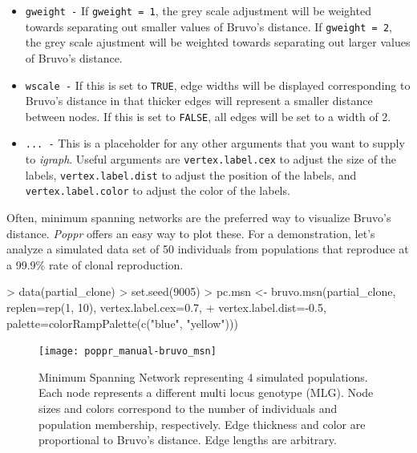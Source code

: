 \documentclass[letterpaper]{article}
\begin{document}
\begin{itemize}
  \item \texttt{gweight -} If \texttt{gweight = 1}, the grey scale adjustment will be weighted towards separating out smaller values of Bruvo's distance. If \texttt{gweight = 2}, the grey scale ajustment will be weighted towards separating out larger values of Bruvo's distance.
  \item \texttt{wscale -} If this is set to \texttt{TRUE}, edge widths will be displayed corresponding to Bruvo's distance in that thicker edges will represent a smaller distance between nodes. If this is set to \texttt{FALSE}, all edges will be set to a width of 2. 
  \item \texttt{... -} This is a placeholder for any other arguments that you want to supply to \textit{igraph}. Useful arguments are \texttt{vertex.label.cex} to adjust the size of the labels, \texttt{vertex.label.dist} to adjust the position of the labels, and \texttt{vertex.label.color} to adjust the color of the labels.
\end{itemize}

Often, minimum spanning networks are the preferred way to visualize Bruvo's distance. \textit{Poppr} offers an easy way to plot these. For a demonstration, let's analyze a simulated data set of 50 individuals from populations that reproduce at a 99.9\% rate of clonal reproduction.

\begin{Schunk}
\begin{Sinput}
> data(partial_clone)
> set.seed(9005)
> pc.msn <- bruvo.msn(partial_clone, replen=rep(1, 10), vertex.label.cex=0.7, 
+           vertex.label.dist=-0.5, palette=colorRampPalette(c("blue", "yellow")))
\end{Sinput}
\end{Schunk}
\begin{figure}[ht!]
  \centering
  \caption{\footnotesize Minimum Spanning Network representing 4 simulated populations. Each node represents a different multi locus genotype (MLG). Node sizes and colors correspond to the number of individuals and population membership, respectively. Edge thickness and color are proportional to Bruvo's distance. Edge lengths are arbitrary.}
  \label{mst_bruvo}
\texttt{[image: poppr\_manual-bruvo\_msn]}
\end{figure}
\end{document}
